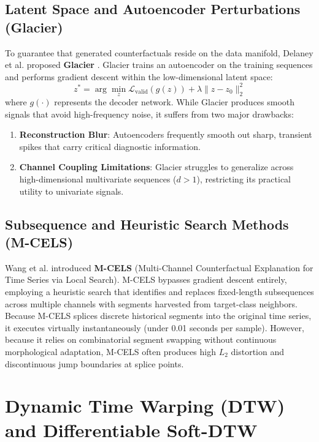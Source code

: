 \documentclass[11pt,a4paper]{report}
\begin{document}
\subsection{Latent Space and Autoencoder Perturbations (Glacier)}
To guarantee that generated counterfactuals reside on the data manifold, Delaney et al. proposed \textbf{Glacier} \cite{delaney2021instance}. Glacier trains an autoencoder on the training sequences and performs gradient descent within the low-dimensional latent space:
\begin{equation}
    z^* = \arg\min_z \mathcal{L}_{\text{valid}}(g(z)) + \lambda \|z - z_0\|_2^2
\end{equation}
where $g(\cdot)$ represents the decoder network. While Glacier produces smooth signals that avoid high-frequency noise, it suffers from two major drawbacks:
\begin{enumerate}
    \item \textbf{Reconstruction Blur}: Autoencoders frequently smooth out sharp, transient spikes that carry critical diagnostic information.
    \item \textbf{Channel Coupling Limitations}: Glacier struggles to generalize across high-dimensional multivariate sequences ($d > 1$), restricting its practical utility to univariate signals.
\end{enumerate}

\subsection{Subsequence and Heuristic Search Methods (M-CELS)}
Wang et al. \cite{wang2021large} introduced \textbf{M-CELS} (Multi-Channel Counterfactual Explanation for Time Series via Local Search). M-CELS bypasses gradient descent entirely, employing a heuristic search that identifies and replaces fixed-length subsequences across multiple channels with segments harvested from target-class neighbors. Because M-CELS splices discrete historical segments into the original time series, it executes virtually instantaneously (under 0.01 seconds per sample). However, because it relies on combinatorial segment swapping without continuous morphological adaptation, M-CELS often produces high $L_2$ distortion and discontinuous jump boundaries at splice points.

\section{Dynamic Time Warping (DTW) and Differentiable Soft-DTW}
\end{document}

